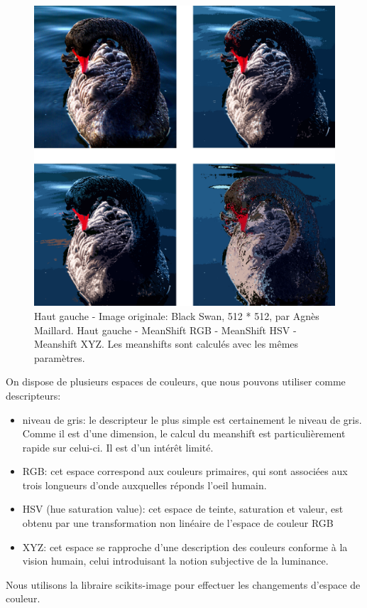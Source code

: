 \documentclass{article}
\begin{document}
\begin{figure}
\includegraphics[width=450px]{images/color_black_swan.png}
\caption{Haut gauche - Image originale: Black Swan, 512 * 512, par Agnès
Maillard. Haut gauche - MeanShift RGB - MeanShift HSV - Meanshift XYZ. Les
meanshifts sont calculés avec les mêmes paramètres.}
\end{figure}

On dispose de plusieurs espaces de couleurs, que nous pouvons utiliser comme
descripteurs:

\begin{itemize}
\item niveau de gris: le descripteur le plus simple est certainement le
niveau de gris. Comme il est d'une dimension, le calcul du meanshift est
particulièrement rapide sur celui-ci. Il est d'un intérêt limité.
\item RGB: cet espace correspond aux couleurs primaires, qui sont associées
aux trois longueurs d'onde auxquelles réponds l'oeil humain.
\item HSV (hue saturation value): cet espace de teinte, saturation et valeur,
est obtenu par une transformation non linéaire de l'espace de couleur RGB
\item XYZ: cet espace se rapproche d'une description des couleurs conforme
à la vision humain, celui introduisant la notion subjective de la luminance.
\end{itemize}

Nous utilisons la libraire scikits-image pour effectuer les changements
d'espace de couleur.
\end{document}
